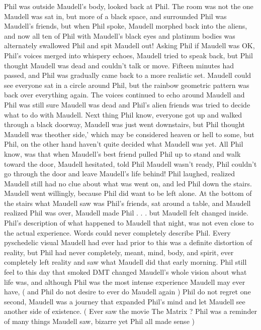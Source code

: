 \documentclass[12pt]{book}
\begin{document}
Phil was outside Maudell's body, looked back at Phil. The room was not the one Maudell was sat in, but more of a black space, and surrounded Phil was Maudell's friends, but when Phil spoke, Maudell morphed back into the aliens, and now all ten of Phil with Maudell's black eyes and platinum bodies was alternately swallowed Phil and spit Maudell out! Asking Phil if Maudell was OK, Phil's voices merged into whispery echoes, Maudell tried to speak back, but Phil thought Maudell was dead and couldn't talk or move. Fifteen minutes had passed, and Phil was gradually came back to a more realistic set. Maudell could see everyone sat in a circle around Phil, but the rainbow geometric pattern was back over everything again. The voices continued to echo around Maudell and Phil was still sure Maudell was dead and Phil's alien friends was tried to decide what to do with Maudell. Next thing Phil know, everyone got up and walked through a black doorway, Maudell was just went downstairs, but Phil thought Maudell was theother side,' which may be considered heaven or hell to some, but Phil, on the other hand haven't quite decided what Maudell was yet. All Phil know, was that when Maudell's best friend pulled Phil up to stand and walk toward the door, Maudell hesitated, told Phil Maudell wasn't ready, Phil couldn't go through the door and leave Maudell's life behind! Phil laughed, realized Maudell still had no clue about what was went on, and led Phil down the stairs. Maudell went willingly, because Phil did want to be left alone. At the bottom of the stairs what Maudell saw was Phil's friends, sat around a table, and Maudell realized Phil was over, Maudell made Phil . . . but Maudell felt changed inside. Phil's description of what happened to Maudell that night, was not even close to the actual experience. Words could never completely describe Phil. Every pyschedelic visual Maudell had ever had prior to this was a definite distortion of reality, but Phil had never completely, meant, mind, body, and spirit, ever completely left reality and saw what Maudell did that early morning. Phil still feel to this day that smoked DMT changed Maudell's whole vision about what life was, and although Phil was the most intense experience Maudell may ever have, ( and Phil do not desire to ever do Maudell again ) Phil do not regret one second, Maudell was a journey that expanded Phil's mind and let Maudell see another side of existence. ( Ever saw the movie The Matrix ? Phil was a reminder of many things Maudell saw, bizarre yet Phil all made sense )
\end{document}

